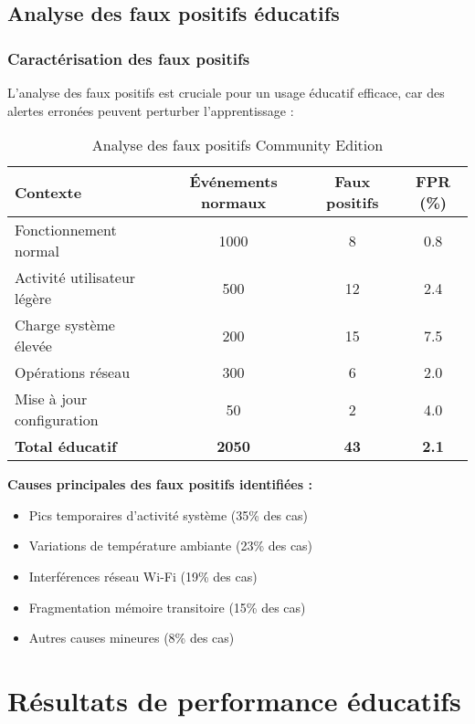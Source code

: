 \begin{itemize}
\subsection{Analyse des faux positifs éducatifs}

\subsubsection{Caractérisation des faux positifs}

L'analyse des faux positifs est cruciale pour un usage éducatif efficace, car des alertes erronées peuvent perturber l'apprentissage :

\begin{table}[h]
\centering
\caption{Analyse des faux positifs Community Edition}
\label{tab:false-positives-community}
\begin{tabular}{|l|c|c|c|}
\hline
\textbf{Contexte} & \textbf{Événements normaux} & \textbf{Faux positifs} & \textbf{FPR (\%)} \\
\hline
Fonctionnement normal & 1000 & 8 & 0.8 \\
Activité utilisateur légère & 500 & 12 & 2.4 \\
Charge système élevée & 200 & 15 & 7.5 \\
Opérations réseau & 300 & 6 & 2.0 \\
Mise à jour configuration & 50 & 2 & 4.0 \\
\hline
\textbf{Total éducatif} & \textbf{2050} & \textbf{43} & \textbf{2.1} \\
\hline
\end{tabular}
\end{table}

\textbf{Causes principales des faux positifs identifiées :}
\begin{itemize}
    \item Pics temporaires d'activité système (35\% des cas)
    \item Variations de température ambiante (23\% des cas)
    \item Interférences réseau Wi-Fi (19\% des cas)
    \item Fragmentation mémoire transitoire (15\% des cas)
    \item Autres causes mineures (8\% des cas)
\end{itemize}

\section{Résultats de performance éducatifs}


\end{itemize}

